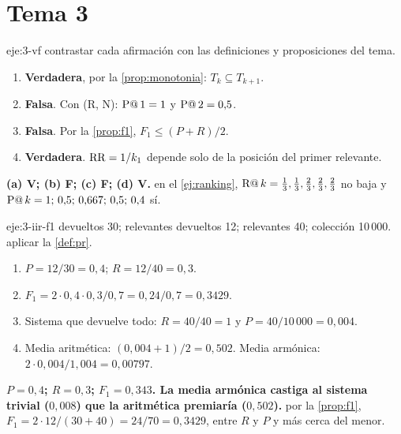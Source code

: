 \section{Tema 3}

\begin{solucion}{eje:3-vf}
\planteamiento contrastar cada afirmación con las definiciones y proposiciones del tema.
\pasos
\begin{enumerate}[label=(\alph*)]
  \item \textbf{Verdadera}, por la \cref{prop:monotonia}: $T_k\subseteq T_{k+1}$.
  \item \textbf{Falsa}. Con (R, N): $\operatorname{P@}1=1$ y $\operatorname{P@}2=0{,}5$.
  \item \textbf{Falsa}. Por la \cref{prop:f1}, $F_1\le(P+R)/2$.
  \item \textbf{Verdadera}. $\operatorname{RR}=1/k_1$ depende solo de la posición del primer relevante.
\end{enumerate}
\resultado \textbf{(a) V; (b) F; (c) F; (d) V.}
\comprobacion en el \cref{ej:ranking}, $\operatorname{R@}k=\frac13,\frac13,\frac23,\frac23,\frac23$ no baja y $\operatorname{P@}k=1;\,0{,}5;\,0{,}667;\,0{,}5;\,0{,}4$ sí.
\end{solucion}

\begin{solucion}{eje:3-iir-f1}
\datos devueltos 30; relevantes devueltos 12; relevantes 40; colección 10\,000.
\planteamiento aplicar la \cref{def:pr}.
\pasos
\begin{enumerate}[label=\arabic*.]
  \item $P=12/30=0{,}4$; $R=12/40=0{,}3$.
  \item $F_1=2\cdot 0{,}4\cdot 0{,}3/0{,}7=0{,}24/0{,}7=0{,}3429$.
  \item Sistema que devuelve todo: $R=40/40=1$ y $P=40/10\,000=0{,}004$.
  \item Media aritmética: $(0{,}004+1)/2=0{,}502$. Media armónica: $2\cdot 0{,}004/1{,}004=0{,}00797$.
\end{enumerate}
\resultado \textbf{$P=0{,}4$; $R=0{,}3$; $F_1=0{,}343$. La media armónica castiga al sistema trivial ($0{,}008$) que la aritmética premiaría ($0{,}502$).}
\comprobacion por la \cref{prop:f1}, $F_1=2\cdot 12/(30+40)=24/70=0{,}3429$, entre $R$ y $P$ y más cerca del menor.
\end{solucion}

